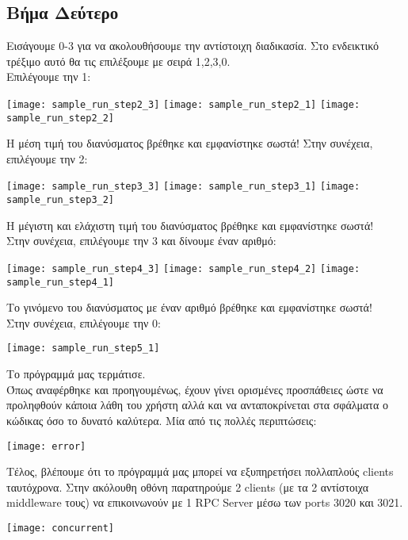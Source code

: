 \subsection{Βήμα Δεύτερο}
Εισάγουμε 0-3 για να ακολουθήσουμε την αντίστοιχη διαδικασία.
Στο ενδεικτικό τρέξιμο αυτό θα τις επιλέξουμε με σειρά 1,2,3,0.
\\
Επιλέγουμε την 1:
\begin{center}
\texttt{[image: sample\_run\_step2\_3]}
\texttt{[image: sample\_run\_step2\_1]}
\texttt{[image: sample\_run\_step2\_2]}
\end{center}
Η μέση τιμή του διανύσματος βρέθηκε και εμφανίστηκε σωστά!
Στην συνέχεια, επιλέγουμε την 2:
\begin{center}
\texttt{[image: sample\_run\_step3\_3]}
\texttt{[image: sample\_run\_step3\_1]}
\texttt{[image: sample\_run\_step3\_2]}
\end{center}
Η μέγιστη και ελάχιστη τιμή του διανύσματος βρέθηκε και εμφανίστηκε σωστά!
\\
Στην συνέχεια, επιλέγουμε την 3 και δίνουμε έναν αριθμό:
\begin{center}
\texttt{[image: sample\_run\_step4\_3]}
\texttt{[image: sample\_run\_step4\_2]}
\texttt{[image: sample\_run\_step4\_1]}
\end{center}
Το γινόμενο του διανύσματος με έναν αριθμό βρέθηκε και εμφανίστηκε σωστά!
\\
Στην συνέχεια, επιλέγουμε την 0:
\begin{center}
\texttt{[image: sample\_run\_step5\_1]}
\end{center}
Το πρόγραμμά μας τερμάτισε.
\\
Όπως αναφέρθηκε και προηγουμένως, έχουν γίνει ορισμένες προσπάθειες
ώστε να προληφθούν κάποια λάθη του χρήστη αλλά και να ανταποκρίνεται στα
σφάλματα ο κώδικας όσο το δυνατό καλύτερα. Μία από τις πολλές περιπτώσεις:
\begin{center}
    \texttt{[image: error]}
\end{center}
Τέλος, βλέπουμε ότι το πρόγραμμά μας μπορεί να εξυπηρετήσει πολλαπλούς clients
ταυτόχρονα.
Στην ακόλουθη οθόνη παρατηρούμε 2 clients (με τα 2 αντίστοιχα middleware τους)
να επικοινωνούν με 1 RPC Server μέσω των ports 3020 και 3021.
\begin{center}
    \texttt{[image: concurrent]}
\end{center}

